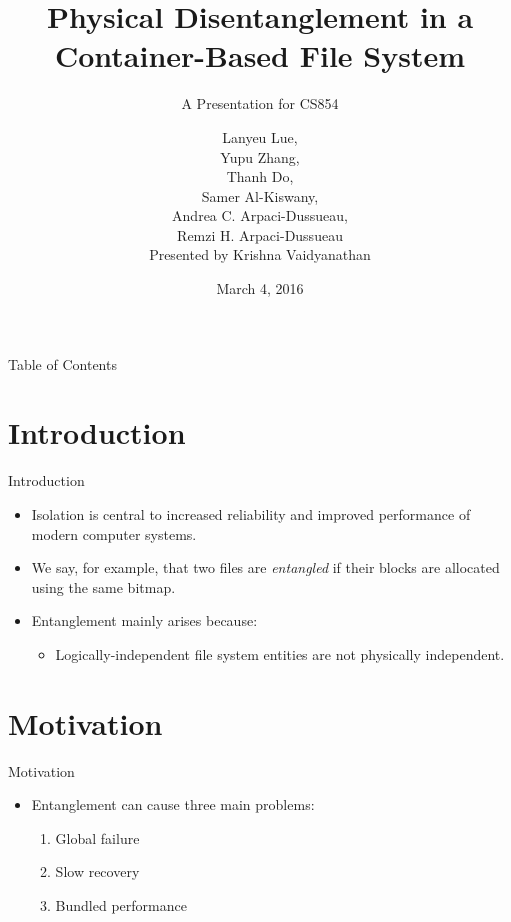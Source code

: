 \documentclass[aspectratio=169]{beamer}
\title[IceFS]{Physical Disentanglement in a Container-Based File System}
\subtitle{A Presentation for CS854}
\author[Presented by Krishna Vaidyanathan]{Lanyeu Lue,\\Yupu Zhang,\\Thanh
    Do,\\Samer Al-Kiswany,\\Andrea C. Arpaci-Dussueau,\\Remzi
    H. Arpaci-Dussueau\\\vspace{2em}Presented by Krishna Vaidyanathan}
\date{March 4, 2016}
\newcommand{\bi}{\begin{itemize}}
\newcommand{\ei}{\end{itemize}}
\newcommand{\bn}{\begin{enumerate}}
\newcommand{\en}{\end{enumerate}}
\begin{document}
\frame[plain]{\titlepage}

\begin{frame}{Table of Contents}
\tableofcontents
\end{frame}

\section{Introduction}
\begin{frame}{Introduction}
    \bi
\item Isolation is central to increased reliability and improved performance of
    modern computer systems.
\item We say, for example, that two files are \textit{entangled} if their
    blocks are allocated using the same bitmap.
\item Entanglement mainly arises because:
    \bi
\item Logically-independent file system entities are not physically independent.
    \ei
    \ei
\end{frame}

\section{Motivation}
\begin{frame}{Motivation}
    \bi
\item Entanglement can cause three main problems:
    \bn
\item Global failure
\item Slow recovery
\item Bundled performance
    \en
    \ei
\end{frame}
\end{document}

